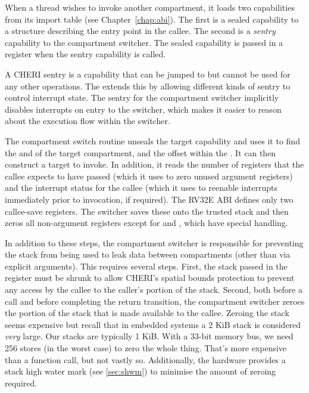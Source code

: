 When a thread wishes to invoke another compartment, it loads two capabilities from its import table (see Chapter~\ref{chap:abi}).
The first is a sealed capability to a structure describing the entry point in the callee.
The second is a \textit{sentry} capability to the compartment switcher.
The sealed capability is passed in a register when the sentry capability is called.

A CHERI sentry is a capability that can be jumped to but cannot be used for any other operations.
The \cherimcuisa{} extends this by allowing different kinds of sentry to control interrupt state.
The sentry for the compartment switcher implicitly disables interrupts on entry to the switcher, which makes it easier to reason about the execution flow within the switcher.

The compartment switch routine unseals the target capability and uses it to find the \PCC{} and \CGP{} of the target compartment, and the offset within the \PCC{}.
It can then construct a target to invoke.
In addition, it reads the number of registers that the callee expects to have passed (which it uses to zero unused argument registers) and the interrupt status for the callee (which it uses to reenable interrupts immediately prior to invocation, if required).
The RV32E ABI defines only two callee-save registers.
The switcher saves these onto the trusted stack and then zeros all non-argument registers except for \CGP{}  and \CSP{}, which have special handling.

In addition to these steps, the compartment switcher is responsible for preventing the stack from being used to leak data between compartments (other than via explicit arguments).
This requires several steps.
First, the stack passed in the \CSP{} register must be shrunk to allow CHERI's spatial bounds protection to prevent any access by the callee to the caller's portion of the stack.
Second, both before a call and before completing the return transition, the compartment switcher zeroes the portion of the stack that is made available to the callee.
Zeroing the stack seems expensive but recall that in embedded systems a 2 KiB stack is considered \textit{very} large.
Our stacks are typically 1 KiB.
With a 33-bit memory bus, we need 256 stores (in the worst case) to zero the whole thing.
That's more expensive than a function call, but not vastly so.
Additionally, the hardware provides a stack high water mark (see \cref{sec:shwm}) to minimise the amount of zeroing required.

